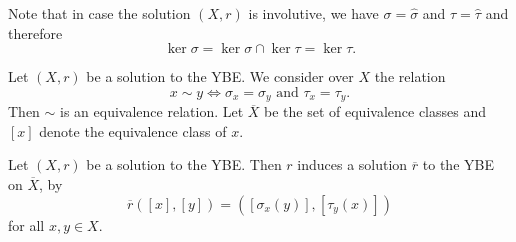 Note that in case the solution $(X,r)$ is involutive, we have $\sigma=\widehat{\sigma}$ and $\tau=\widehat{\tau}$ and therefore \[\ker \sigma=\ker\sigma\cap\ker\tau=\ker\tau.\] 



Let $(X,r)$ be a solution to the YBE. 
We consider over $X$ the relation
\[x\sim y\Longleftrightarrow \sigma_x=\sigma_y\text{ and }\tau_x=\tau_y.\]
Then $\sim$ is an equivalence relation. Let $\overline{X}$ be the set of equivalence classes and $[x]$ denote the equivalence class of $x$. 


\begin{proposition}\label{prop:retractissolution}
	Let $(X,r)$ be a solution to the YBE. Then $r$ induces a solution $\overline{r}$ to the YBE on $\overline{X}$, by
	\[\overline{r}([x],[y])=([\sigma_x(y)],[\tau_y(x)])\]
	for all $x,y\in X$. 
	\end{proposition}


